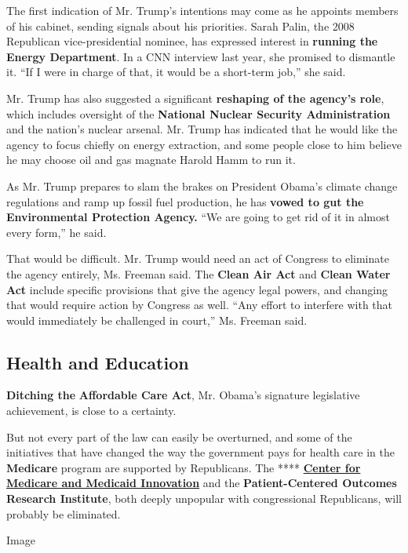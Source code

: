 The first indication of Mr. Trump's intentions may come as he appoints
members of his cabinet, sending signals about his priorities. Sarah
Palin, the 2008 Republican vice-presidential nominee, has expressed
interest in \textbf{running the} \textbf{Energy Department}. In a CNN
interview last year, she promised to dismantle it. ``If I were in charge
of that, it would be a short-term job,'' she said.

Mr. Trump has also suggested a significant \textbf{reshaping of the
agency's role}, which includes oversight of the \textbf{National Nuclear
Security Administration} and the nation's nuclear arsenal. Mr. Trump has
indicated that he would like the agency to focus chiefly on energy
extraction, and some people close to him believe he may choose oil and
gas magnate Harold Hamm to run it.

As Mr. Trump prepares to slam the brakes on President Obama's climate
change regulations and ramp up fossil fuel production, he has
\textbf{vowed to gut the Environmental Protection Agency.} ``We are
going to get rid of it in almost every form,'' he said.

That would be difficult. Mr. Trump would need an act of Congress to
eliminate the agency entirely, Ms. Freeman said. The \textbf{Clean Air
Act} and \textbf{Clean Water Act} include specific provisions that give
the agency legal powers, and changing that would require action by
Congress as well. ``Any effort to interfere with that would immediately
be challenged in court,'' Ms. Freeman said.

\hypertarget{health-and-education}{%
\subsection{Health and Education}\label{health-and-education}}

\textbf{Ditching the} \textbf{Affordable Care Act}, Mr. Obama's
signature legislative achievement, is close to a certainty.

But not every part of the law can easily be overturned, and some of the
initiatives that have changed the way the government pays for health
care in the \textbf{Medicare} program are supported by Republicans. The
**** \href{https://innovation.cms.gov/}{\textbf{Center for Medicare and
Medicaid Innovation}} and the \textbf{Patient-Centered Outcomes Research
Institute}, both deeply unpopular with congressional Republicans, will
probably be eliminated.

Image

